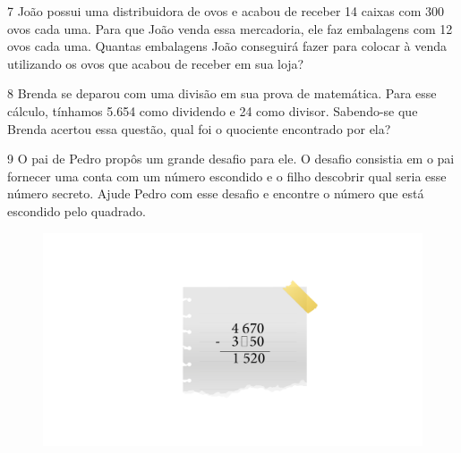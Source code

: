 
\num{7} João possui uma distribuidora de ovos e acabou de receber 14 caixas
com 300 ovos cada uma. Para que João venda essa mercadoria, ele faz
embalagens com 12 ovos cada uma. Quantas embalagens João conseguirá
fazer para colocar à venda utilizando os ovos que acabou de receber em
sua loja?




\num{8} Brenda se deparou com uma divisão em sua prova de matemática. Para
esse cálculo, tínhamos 5.654 como dividendo e 24 como divisor. Sabendo-se
que Brenda acertou essa questão, qual foi o quociente encontrado por ela?



\num{9} O pai de Pedro propôs um grande desafio para ele. O desafio
consistia em o pai fornecer uma conta com um número escondido e o filho descobrir qual seria esse número secreto. Ajude Pedro com esse
desafio e encontre o número que está escondido pelo quadrado.

\begin{figure}[htpb!]
\includegraphics[width=\textwidth]{../ilustracoes/MAT5/SAEB_5ANO_MAT_figura21.png}
\end{figure}


